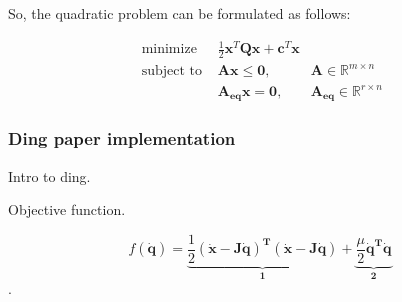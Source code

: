So, the quadratic problem can be formulated as follows:


\begin{equation}
    \label{eq:QP}
    \begin{array}{lll}
        \text { minimize } & \frac{1}{2} \mathbf{x}^{T} \mathbf{Q} \mathbf{x}+\mathbf{c}^{T} \mathbf{x} &\\
        \text { subject to } & \mathbf{A} \mathbf{x} \leq \mathbf{0}, & \mathbf{A} \in \mathbb{R}^{m \times n} \\
        & \mathbf{A_{eq}} \mathbf{x} = \mathbf{0}, & \mathbf{A_{eq}} \in \mathbb{R}^{r \times n}
    \end{array}
\end{equation}

\subsubsection{Ding paper implementation}
\label{sss:ding}

Intro to ding.

Objective function.

\begin{equation*}
    f(\dot{\mathbf{q}}) = \underbrace{\frac{1}{2} \mathbf{(\dot{x}-J\dot{q})^{T} (\dot{x}-J\dot{q})}}_\textbf{1} + \underbrace{\frac{\mu}{2} \mathbf{\dot{q}^{T} \dot{q}}}_\textbf{2}
\end{equation*}.

